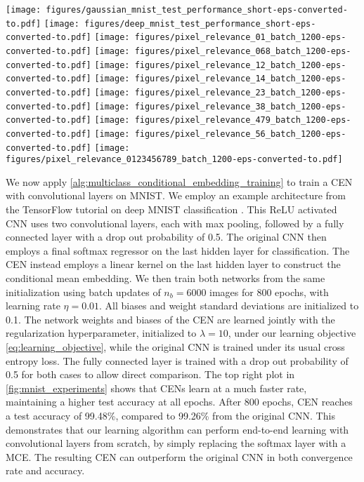 \documentclass[runningheads, envcountsame, a4paper]{llncs}
\begin{document}
			\begin{figure*}[t]
				\centering 
				\texttt{[image: figures/gaussian\_mnist\_test\_performance\_short-eps-converted-to.pdf]}
				\texttt{[image: figures/deep\_mnist\_test\_performance\_short-eps-converted-to.pdf]}
				\texttt{[image: figures/pixel\_relevance\_01\_batch\_1200-eps-converted-to.pdf]}
				\texttt{[image: figures/pixel\_relevance\_068\_batch\_1200-eps-converted-to.pdf]}
				\texttt{[image: figures/pixel\_relevance\_12\_batch\_1200-eps-converted-to.pdf]}
				\texttt{[image: figures/pixel\_relevance\_14\_batch\_1200-eps-converted-to.pdf]}
				\texttt{[image: figures/pixel\_relevance\_23\_batch\_1200-eps-converted-to.pdf]}
				\texttt{[image: figures/pixel\_relevance\_38\_batch\_1200-eps-converted-to.pdf]}
				\texttt{[image: figures/pixel\_relevance\_479\_batch\_1200-eps-converted-to.pdf]}
				\texttt{[image: figures/pixel\_relevance\_56\_batch\_1200-eps-converted-to.pdf]}
				\texttt{[image: figures/pixel\_relevance\_0123456789\_batch\_1200-eps-converted-to.pdf]}
				\caption{Top: Test accuracy by learning Gaussian kernels (left) and deep convolutional features (right); Bottom: Learned pixel length scales under \gls{ARD} kernels}
				\label{fig:mnist_experiments}
			\end{figure*}

			We now apply \cref{alg:multiclass_conditional_embedding_training} to train a \gls{CEN} with convolutional layers on MNIST. We employ an example architecture from the TensorFlow tutorial on deep MNIST classification \citep{abadi2016tensorflow}. This ReLU activated \gls{CNN} uses two convolutional layers, each with max pooling, followed by a fully connected layer with a drop out probability of 0.5. The original \gls{CNN} then employs a final softmax regressor on the last hidden layer for classification. The \gls{CEN} instead employs a linear kernel on the last hidden layer to construct the conditional mean embedding. We then train both networks from the same initialization using batch updates of $n_{b} = 6000$ images for 800 epochs, with learning rate $\eta = 0.01$. All biases and weight standard deviations are initialized to 0.1. The network weights and biases of the \gls{CEN} are learned jointly with the regularization hyperparameter, initialized to $\lambda = 10$, under our learning objective \eqref{eq:learning_objective}, while the original \gls{CNN} is trained under its usual cross entropy loss. The fully connected layer is trained with a drop out probability of 0.5 for both cases to allow direct comparison. The top right plot in \cref{fig:mnist_experiments} shows that \glspl{CEN} learn at a much faster rate, maintaining a higher test accuracy at all epochs. After 800 epochs, \gls{CEN} reaches a test accuracy of 99.48\%, compared to 99.26\% from the original \gls{CNN}. This demonstrates that our learning algorithm can perform end-to-end learning with convolutional layers from scratch, by simply replacing the softmax layer with a \gls{MCE}. The resulting \gls{CEN} can outperform the original \gls{CNN} in both convergence rate and accuracy.
	
\end{document}

